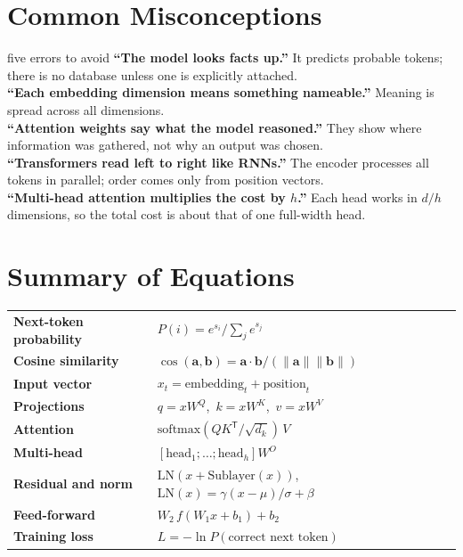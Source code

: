 \documentclass[11pt]{article}
\begin{document}
\section{Common Misconceptions}
\begin{pitfall}{five errors to avoid}
\textbf{``The model looks facts up.''} It predicts probable tokens; there is no database unless one is explicitly attached.\\
\textbf{``Each embedding dimension means something nameable.''} Meaning is spread across all dimensions.\\
\textbf{``Attention weights say what the model reasoned.''} They show where information was gathered, not why an output was chosen.\\
\textbf{``Transformers read left to right like RNNs.''} The encoder processes all tokens in parallel; order comes only from position vectors.\\
\textbf{``Multi-head attention multiplies the cost by $h$.''} Each head works in $d/h$ dimensions, so the total cost is about that of one full-width head.
\end{pitfall}

\section{Summary of Equations}
\begin{center}\small\renewcommand{\arraystretch}{1.6}
\begin{tabular}{ll}\toprule
\textbf{Next-token probability} & $P(i)=e^{s_i}/\sum_j e^{s_j}$\\
\textbf{Cosine similarity} & $\cos(\mathbf a,\mathbf b)=\mathbf a\cdot\mathbf b/(\lVert\mathbf a\rVert\lVert\mathbf b\rVert)$\\
\textbf{Input vector} & $x_t=\text{embedding}_t+\text{position}_t$\\
\textbf{Projections} & $q=xW^Q$,\ $k=xW^K$,\ $v=xW^V$\\
\textbf{Attention} & $\text{softmax}(QK^{\mathsf T}/\sqrt{d_k})\,V$\\
\textbf{Multi-head} & $[\text{head}_1;\dots;\text{head}_h]W^O$\\
\textbf{Residual and norm} & $\text{LN}(x+\text{Sublayer}(x))$,\ \ $\text{LN}(x)=\gamma(x-\mu)/\sigma+\beta$\\
\textbf{Feed-forward} & $W_2\,f(W_1x+b_1)+b_2$\\
\textbf{Training loss} & $L=-\ln P(\text{correct next token})$\\\bottomrule
\end{tabular}\end{center}
\end{document}

